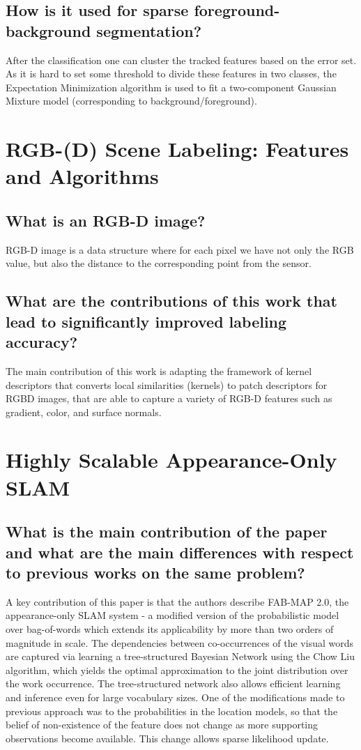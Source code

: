 \documentclass[paper=a4, fontsize=11pt]{scrartcl} %
\numberwithin{equation}{section} %
\numberwithin{figure}{section} %
\numberwithin{table}{section} %
\begin{document}
\subsection{How is it used for sparse foreground-background segmentation?}
After the classification one can cluster the tracked features based on the error set. As it is hard to set some threshold to divide these features in two classes, the Expectation Minimization algorithm is used to fit a two-component Gaussian Mixture model (corresponding to background/foreground).

\section{RGB-(D) Scene Labeling: Features and Algorithms}
\subsection{What is an RGB-D image?}
RGB-D image is a data structure where for each pixel we have not only the RGB value, but also the distance to the corresponding point from the sensor.
\subsection{What are the contributions of this work that lead to significantly improved labeling accuracy?}
The main contribution of this work is adapting the framework of kernel descriptors that converts local similarities (kernels) to patch descriptors for RGBD images, that are able to capture a variety of RGB-D features such as gradient, color, and surface normals.

\section{Highly Scalable Appearance-Only SLAM}
\subsection{What is the main contribution of the paper and what are the main differences with respect to previous works on the same problem?}
A key contribution of this paper is that the authors describe FAB-MAP 2.0, the appearance-only SLAM system - a modified version of the probabilistic model over bag-of-words which extends its applicability by more than two orders of magnitude in scale. 
The dependencies between co-occurrences of the visual words are captured via learning a tree-structured Bayesian Network using the Chow Liu algorithm, which yields the optimal approximation to the joint distribution over the work occurrence. The tree-structured network also allows efficient learning and inference even for large vocabulary sizes.
One of the modifications made to previous approach was to the probabilities in the location models, so that the belief of non-existence of the feature does not change as more supporting observations become available. This change allows sparse likelihood update.
\end{document}
